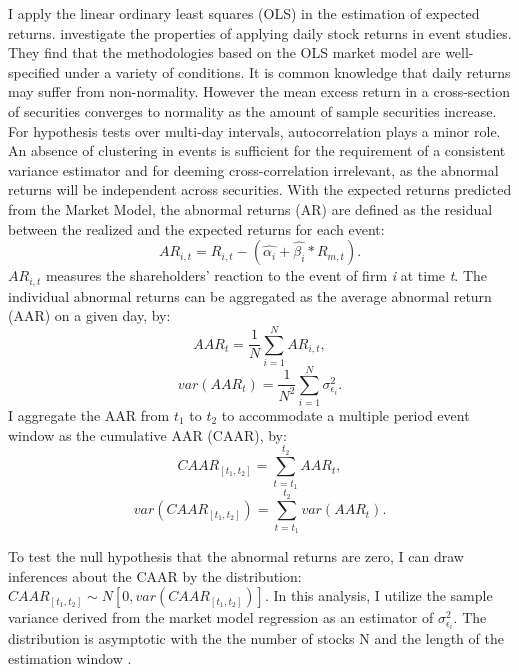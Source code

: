I apply the linear ordinary least squares (OLS) in the estimation of expected returns. \cite{brown1985using} investigate the properties of applying daily stock returns in event studies. They find that the methodologies based on the OLS market model are well-specified under a variety of conditions. It is common knowledge that daily returns may suffer from non-normality. However the mean excess return in a cross-section of securities converges to normality as the amount of sample securities increase. For hypothesis tests over multi-day intervals, autocorrelation plays a minor role. An absence of clustering in events is sufficient for the requirement of a consistent variance estimator and for deeming cross-correlation irrelevant, as the abnormal returns will be independent across securities.  With the expected returns predicted from the Market Model, the abnormal returns (AR) are defined as the residual between the realized and the expected returns for each event:
 \begin{equation}
    AR_{i,t} = R_{i,t} - (\hat{\alpha_i} + \hat{\beta_i} * R_{m,t}).
 \end{equation} 
$AR_{i,t}$ measures the shareholders' reaction to the event of firm \textit{i} at time \textit{t}. The individual abnormal returns can be aggregated as the average abnormal return (AAR) on a given day, by:  
 \begin{equation}
 AAR_t = \frac{1}{N} \sum_{i=1} ^N AR_{i,t},
 \end{equation}
 \begin{equation}
 var(AAR_{t}) = \frac{1}{N^2} \sum_{i=1} ^N \sigma_{\epsilon_i} ^2.
 \end{equation}
I aggregate the AAR from $t_1$ to $t_2$ to accommodate a multiple period event window as the cumulative AAR (CAAR), by:
 \begin{equation}
 CAAR_{[t_1,t_2]} = \sum_{t = t_1 } ^{t_2} AAR_{t},
 \end{equation}
 \begin{equation}
 var(CAAR_{[t_1,t_2]}) = \sum ^{t_2}_{t=t_1} var(AAR_t).
 \end{equation}

To test the null hypothesis that the abnormal returns are zero, I can draw inferences about the CAAR by the distribution: $CAAR_{[t_1,t_2]} \sim N[0,var(CAAR_{[t_1,t_2]})]$. In this analysis, I utilize the sample variance derived from the market model regression as an estimator of $\sigma^2_{\epsilon_i}$. The distribution is asymptotic with the the number of stocks N and the length of the estimation window \citep{Event_studies}.  
 
